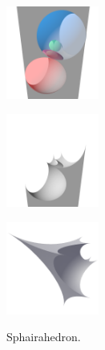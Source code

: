\documentclass[suppldata, dvipdfmx]{interact}
\theoremstyle{plain}%
\theoremstyle{definition}
\theoremstyle{remark}
\theoremstyle{problemstyle}
\begin{document}
\begin{figure}[h!tbp]
  \begin{minipage}[t]{0.3\textwidth}
   \centering
   \includegraphics[width=1.2in, height=1.2in, keepaspectratio]
   {./img/sphairahedralPrism/sphairaAll.png}
   \label{fig:sphairaPrismAll}
  \end{minipage}
  \hspace*{\fill}
  \begin{minipage}[t]{0.3\textwidth}
   \centering
   \includegraphics[width=1.2in, height=1.2in, keepaspectratio]
   {./img/sphairahedralPrism/sphairaHalf.png}
   \label{fig:sphairaPrismHalf}
  \end{minipage}
  \hspace*{\fill}
  \begin{minipage}[t]{0.3\textwidth}
   \centering
   \includegraphics[width=1.2in, height=1.2in,
   keepaspectratio]{./img/sphairahedralPrism/sphairahedron.png} 
   \label{fig:sphairahedronFinite}
  \end{minipage}
  \hspace*{\fill}
  \caption{Sphairahedron.}
  \label{fig:sphairahedron}
 \end{figure}
\end{document}
